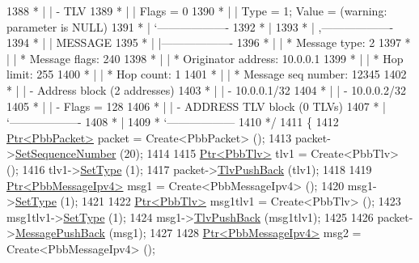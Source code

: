 \begin{DoxyCode}
1388 \textcolor{comment}{         * |    |     - TLV}
1389 \textcolor{comment}{         * |    |         Flags = 0}
1390 \textcolor{comment}{         * |    |         Type = 1; Value = (warning: parameter is NULL)}
1391 \textcolor{comment}{         * |    `-------------------}
1392 \textcolor{comment}{         * |}
1393 \textcolor{comment}{         * |    ,-------------------}
1394 \textcolor{comment}{         * |    |  MESSAGE}
1395 \textcolor{comment}{         * |    |-------------------}
1396 \textcolor{comment}{         * |    | * Message type:       2}
1397 \textcolor{comment}{         * |    | * Message flags:  240}
1398 \textcolor{comment}{         * |    | * Originator address: 10.0.0.1}
1399 \textcolor{comment}{         * |    | * Hop limit:          255}
1400 \textcolor{comment}{         * |    | * Hop count:          1}
1401 \textcolor{comment}{         * |    | * Message seq number: 12345}
1402 \textcolor{comment}{         * |    | - Address block (2 addresses)}
1403 \textcolor{comment}{         * |    |     - 10.0.0.1/32}
1404 \textcolor{comment}{         * |    |     - 10.0.0.2/32}
1405 \textcolor{comment}{         * |    |     - Flags = 128}
1406 \textcolor{comment}{         * |    | - ADDRESS TLV block (0 TLVs)}
1407 \textcolor{comment}{         * |    `-------------------}
1408 \textcolor{comment}{         * |}
1409 \textcolor{comment}{         * `------------------}
1410 \textcolor{comment}{   */}
1411   \{
1412     \hyperlink{classns3_1_1Ptr}{Ptr<PbbPacket>} packet = Create<PbbPacket> ();
1413     packet->\hyperlink{classns3_1_1PbbPacket_a7d6a1602be86109760d0f26ff9bbbb8e}{SetSequenceNumber} (20);
1414 
1415     \hyperlink{classns3_1_1Ptr}{Ptr<PbbTlv>} tlv1 = Create<PbbTlv> ();
1416     tlv1->\hyperlink{classns3_1_1PbbTlv_a90a0452018ed364ac37c3ad116dd718b}{SetType} (1);
1417     packet->\hyperlink{classns3_1_1PbbPacket_a34935793e729a106c176db99c969cb42}{TlvPushBack} (tlv1);
1418 
1419     \hyperlink{classns3_1_1Ptr}{Ptr<PbbMessageIpv4>} msg1 = Create<PbbMessageIpv4> ();
1420     msg1->\hyperlink{classns3_1_1PbbMessage_a4b3d1eaabd3e7412a46ac79bf3360dac}{SetType} (1);
1421 
1422     \hyperlink{classns3_1_1Ptr}{Ptr<PbbTlv>} msg1tlv1 = Create<PbbTlv> ();
1423     msg1tlv1->\hyperlink{classns3_1_1PbbTlv_a90a0452018ed364ac37c3ad116dd718b}{SetType} (1);
1424     msg1->\hyperlink{classns3_1_1PbbMessage_aac70b2672f79765cf5cc5b6666018165}{TlvPushBack} (msg1tlv1);
1425 
1426     packet->\hyperlink{classns3_1_1PbbPacket_a4a3170001ef758d9c9c4375b8f089826}{MessagePushBack} (msg1);
1427 
1428     \hyperlink{classns3_1_1Ptr}{Ptr<PbbMessageIpv4>} msg2 = Create<PbbMessageIpv4> ();

\end{DoxyCode}
